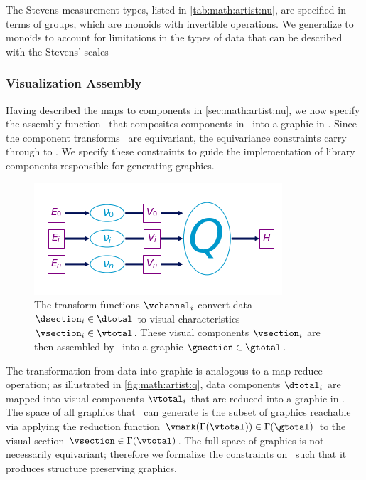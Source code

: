 \documentclass[../main.tex]{subfiles}
\begin{document}
The Stevens measurement types\cite{stevensTheoryScalesMeasurement1946}, listed in \autoref{tab:math:artist:nu}, are specified in terms of groups, which are monoids with invertible operations\cite{remlingAlgebraMath5353}. We generalize to monoids to account for limitations in the types of data that can be described with the Stevens' scales \cite{johnsonPseudoMathematicsMentalSocial1936,thomasMathematizationNotMeasurement2014} 

\subsubsection{Visualization Assembly}
Having described the maps to components in \autoref{sec:math:artist:nu}, we now specify the assembly function \vmarkd\ that composites components in \vtotal\ into a graphic in \gtotal. Since the component transforms \vchannel\ are equivariant, the equivariance constraints carry through to \vmarkd. We specify these constraints to guide the implementation of library components responsible for generating graphics. 

\label{sec:math:artist:q}
\begin{figure}[htb]
  \centering
  \includegraphics[width=\textwidth]{figures/math/path_of_q.png}
  \caption{The transform functions $\vchannel_i$ convert data $\dsection_i\in \dtotal$ to visual characteristics $\vsection_i \in \vtotal$. These visual components $\vsection_i$ are then assembled by \vmark\ into a graphic $\gsection \in \gtotal$.} 
  \label{fig:math:artist:q}
\end{figure}
The transformation from data into graphic is analogous to a map-reduce operation; as illustrated in \autoref{fig:math:artist:q}, data components $\dtotal_{i}$ are mapped into visual components $\vtotal_{i}$ that are reduced into a graphic in \gtotal. The space of all graphics that \vmark\ can generate is the subset of graphics reachable via applying the reduction function $\vmark(\Gamma(\vtotal)) \in \Gamma(\gtotal)$ to the visual section $\vsection \in \Gamma(\vtotal)$. The full space of graphics is not necessarily equivariant; therefore we formalize the constraints on \vmark\ such that it produces structure preserving graphics. 
\end{document}
